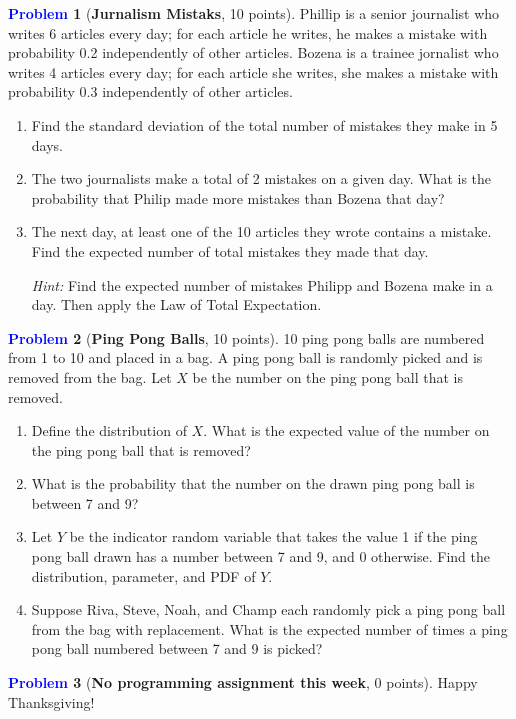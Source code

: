 \documentclass[letterpaper,11pt]{article}
\theoremstyle{plain}%
\theoremstyle{definition}
\newtheorem{problem}{\textcolor{blue}{Problem}}
\theoremstyle{plain}%
\begin{document}
\begin{problem}[\textbf{Jurnalism Mistaks}, 10 points] Phillip is a senior journalist who writes 6 articles every day; for each article he writes, he makes a mistake with probability 0.2 independently of other articles. Bozena is a trainee jornalist who writes 4 articles every day; for each article she writes, she makes a mistake with probability 0.3 independently of other articles.
\begin{enumerate}[label=(\alph*)]
    \item Find the standard deviation of the total number of mistakes they make in 5 days.
    
    \item The two journalists make a total of 2 mistakes on a given day. What is the probability that Philip made more mistakes than Bozena that day?
    
    \item The next day, at least one of the 10 articles they wrote contains a mistake. Find the expected number of total mistakes they made that day.
    
    {\em Hint:} Find the expected number of mistakes Philipp and Bozena make in a day. Then apply the Law of Total Expectation.


    
\end{enumerate}
\end{problem}

\begin{problem}[\textbf{Ping Pong Balls}, 10 points]
    10 ping pong balls are numbered from 1 to 10 and placed in a bag. A ping pong ball is randomly picked and is removed from the bag. Let $X$ be the number on the ping pong ball that is removed.

    \begin{enumerate} [label=(\alph*)]
        \item Define the distribution of $X$. What is the expected value of the number on the ping pong ball that is removed?
        
        \item What is the probability that the number on the drawn ping pong ball is between 7 and 9?
        
        \item Let $Y$ be the indicator random variable that takes the value 1 if the ping pong ball drawn has a number between 7 and 9, and 0 otherwise. Find the distribution, parameter, and PDF of $Y$. 
        
        \item Suppose Riva, Steve, Noah, and Champ each randomly pick a ping pong ball from the bag with replacement. What is the expected number of times a ping pong ball numbered between 7 and 9 is picked?
        
    \end{enumerate}
\end{problem}

\begin{problem}[{\bf No programming assignment this week}, 0 points]
Happy Thanksgiving!
\end{problem}
\end{document}
